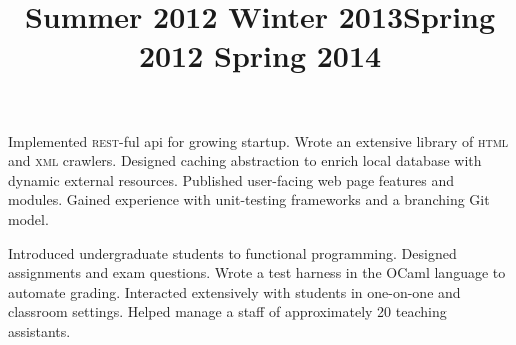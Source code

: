 \begin{resume}
\title{Summer 2012 \textendash Winter 2013}
\location{}
\begin{position}
Implemented \textsc{rest-}ful api for growing startup.
Wrote an extensive library of \textsc{html} and \textsc{xml} crawlers.
Designed caching abstraction to enrich local database with dynamic external resources.
Published user-facing web page features and modules.
Gained experience with unit-testing frameworks and a branching Git model.
\end{position}

\title{Spring 2012 \textendash Spring 2014}
\location{}
\begin{position}
Introduced undergraduate students to functional programming.
Designed assignments and exam questions. 
Wrote a test harness in the OCaml language to automate grading.
Interacted extensively with students in one-on-one and classroom settings.
Helped manage a staff of approximately 20 teaching assistants.
\end{position}





\end{resume}

